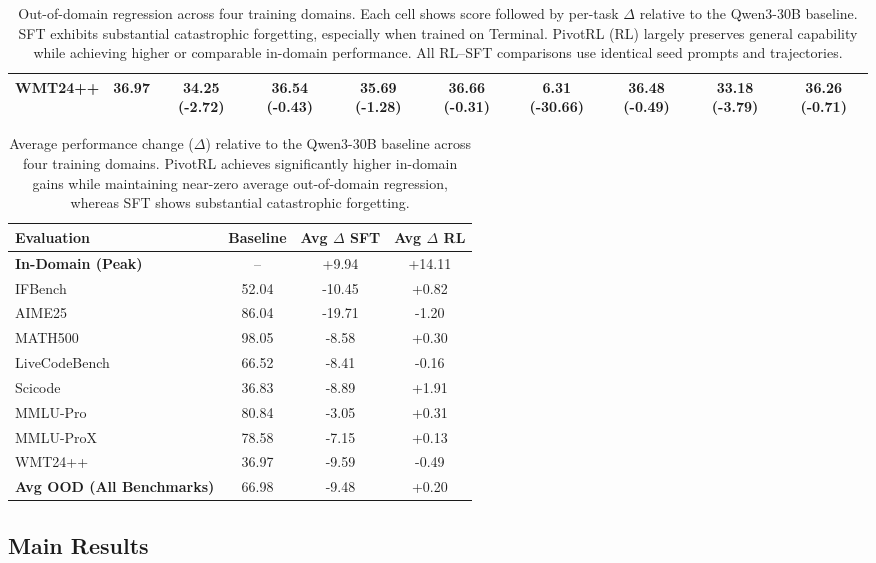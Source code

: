 \begin{table}[!t]
{\begin{tabular}{l c cc cc cc cc}
WMT24++ 
& 36.97 
& 34.25 (-2.72) & 36.54 (-0.43)
& 35.69 (-1.28)  & 36.66 (-0.31)
& 6.31 (-30.66)  & 36.48 (-0.49)
& 33.18 (-3.79)  & 36.26 (-0.71) \\

\bottomrule
\end{tabular}%
}
\caption{
Out-of-domain regression across four training domains.
Each cell shows score followed by per-task $\Delta$ relative to the Qwen3-30B baseline.
SFT exhibits substantial catastrophic forgetting, especially when trained on Terminal.
PivotRL (RL) largely preserves general capability while achieving higher or comparable in-domain performance.
All RL–SFT comparisons use identical seed prompts and trajectories.
}
\label{tab:main_results_regression_delta_inline}
\end{table}


\begin{table}[!t]
\centering
\small
\begin{tabular}{l c cc}
\toprule
\textbf{Evaluation} & \textbf{Baseline} & \textbf{Avg $\Delta$ SFT} & \textbf{Avg $\Delta$ RL} \\
\midrule
\textbf{In-Domain (Peak)} & -- & +9.94 & +14.11 \\
\midrule
IFBench        & 52.04 & -10.45 & +0.82 \\
AIME25         & 86.04 & -19.71 & -1.20 \\
MATH500        & 98.05 & -8.58  & +0.30 \\
LiveCodeBench  & 66.52 & -8.41  & -0.16 \\
Scicode        & 36.83 & -8.89  & +1.91 \\
MMLU-Pro       & 80.84 & -3.05  & +0.31 \\
MMLU-ProX      & 78.58 & -7.15  & +0.13 \\
WMT24++        & 36.97 & -9.59  & -0.49 \\
\midrule
\textbf{Avg OOD (All Benchmarks)} & 66.98 & -9.48 & +0.20 \\
\bottomrule
\end{tabular}
\caption{
Average performance change ($\Delta$) relative to the Qwen3-30B baseline across four training domains. 
PivotRL achieves significantly higher in-domain gains while maintaining near-zero average out-of-domain regression, whereas SFT shows substantial catastrophic forgetting.
}
\label{tab:per_benchmark_avg_regression}
\end{table}



\subsection{Main Results}
